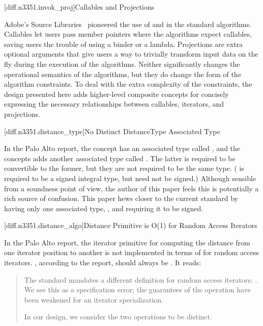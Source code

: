[diff.n3351.invok_proj]{Callables and Projections}

\pnum
Adobe's Source Libraries~\cite{ASL} pioneered the use of  and
 in the standard algorithms. Callables let users pass member pointers
where the algorithms expect callables, saving users the trouble of using a binder or a lambda.
Projections are extra optional arguments that give users a way to trivially transform input data
on the fly during the execution of the algorithms. Neither significantly changes the operational
semantics of the algorithms, but they do change the form of the algorithm constraints. To deal with
the extra complexity of the constraints, the design presented here adds higher-level composite
concepts for concisely expressing the necessary relationships between callables, iterators, and
projections.

[diff.n3351.distance_type]{No Distinct DistanceType Associated Type}

\pnum
In the Palo Alto report, the  concept has an associated type called
, and the  concepts adds another associated type
called . The latter is required to be convertible to the former, but they are
not required to be the same type. ( is required to be a signed integral type,
but  need not be signed.) Although sensible from a soundness point of view,
the author of this paper feels this is potentially a rich source of confusion. This paper hews
closer to the current standard by having only one associated type, , and
requiring it to be signed.

[diff.n3351.distance_algo]{Distance Primitive is O(1) for Random Access Iterators}

\pnum
In the Palo Alto report, the  iterator primitive for computing the distance from one
iterator position to another is not implemented in terms of  for random access
iterators. , according to the report, should always be . It reads:

\begin{quote}
The standard mandates a different definition for random access iterators:
. We see this as a specification error; the guarantees of the
 operation have been weakened for an iterator specialization.

In our design, we consider the two operations to be distinct.
\end{quote}

